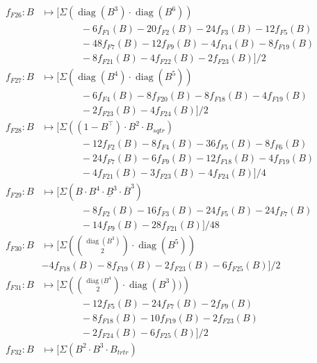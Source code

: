 \documentclass{article}
\theoremstyle{plain}
\DeclareMathOperator{\diag}{diag}
\begin{document}
\begin{align*}
        f_{F26} : B&\mapsto [\Sigma(\diag(B^3)\cdot \diag(B^6))\\
                                &\qquad\qquad-6f_{F1}(B)-20f_{F2}(B)-24f_{F3}(B)-12f_{F5}(B)\\
                                &\qquad\qquad-48f_{F7}(B)-12f_{F9}(B)-4f_{F14}(B)-8f_{F19}(B)\\
                                &\qquad\qquad-8f_{F21}(B)-4f_{F22}(B)-2f_{F23}(B)]/2\\
        f_{F27} : B&\mapsto [\Sigma(\diag(B^4)\cdot \diag(B^5))\\
                                &\qquad\qquad-6f_{F4}(B)-8f_{F20}(B)-8f_{F18}(B)-4f_{F19}(B)\\
                                &\qquad\qquad-2f_{F23}(B)-4f_{F24}(B)]/2\\
        f_{F28} : B&\mapsto [\Sigma((1-B^\top)\cdot B^2\cdot B_{sqtr})\\
                                &\qquad\qquad-12f_{F2}(B)-8f_{F4}(B)-36f_{F5}(B)-8f_{F6}(B)\\
                                &\qquad\qquad-24f_{F7}(B)-6f_{F9}(B)-12f_{F18}(B)-4f_{F19}(B)\\
                                &\qquad\qquad-4f_{F21}(B)-3f_{F23}(B)-4f_{F24}(B)]/4\\
        f_{F29} : B&\mapsto [\Sigma(B\cdot B^4\cdot \underline B^3\cdot \overline B^3)\\
                                &\qquad\qquad-8f_{F2}(B)-16f_{F3}(B)-24f_{F5}(B)-24f_{F7}(B)\\
                                &\qquad\qquad-14f_{F9}(B)-28f_{F21}(B)]/48\\
        f_{F30} : B&\mapsto \Big[\Sigma\left(\binom{\diag(B^3)}{2}\cdot \diag (B^5)\right)\\
                                &-4f_{F18}(B)-8f_{F19}(B)-2f_{F23}(B)-6f_{F25}(B)\Big]/2\\
        f_{F31} : B&\mapsto \Big[\Sigma\left(\binom{\diag(B^4}{2}\cdot \diag(B^3))\right)\\
                                &\qquad\qquad-12f_{F5}(B)-24f_{F7}(B)-2f_{F9}(B)\\
                                &\qquad\qquad-8f_{F18}(B)-10f_{F19}(B)-2f_{F23}(B)\\
                                &\qquad\qquad-2f_{F24}(B)-6f_{F25}(B)\Big]/2\\
        f_{F32} : B&\mapsto [\Sigma(B^2\cdot B^3\cdot B_{trtr})\\

\end{align*}
\end{document}
